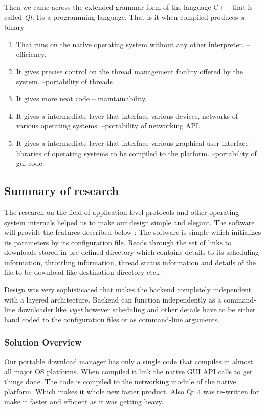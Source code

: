 \documentclass[pdftex,12pt,a4paper,pdfencoding=unicode]{article}
\begin{document}
\begin{onehalfspace}
      Then we came across the extended grammar form of the language C++ that is called \emph{Qt}. Its a programming language.
      That is it when compiled produces a binary
      \begin{enumerate}
        \item That runs on the native operating system without any other interpreter. --efficiency.
        \item It gives precise control on the thread management facility offered by the system. --portability of threads
        \item It gives more neat code -- maintainability.
        \item It gives a intermediate layer that interface various devices, networks of various operating systems.
          --portability of networking API.
        \item It gives a intermediate layer that interface various graphical user interface libraries of operating systems
          to be compiled to the platform. --portability of gui code.
      \end{enumerate}

      \subsection{Summary of research}
      The research on the field of application level protocols and other operating system internals helped us to make our design simple and
      elegant. The software will provide the features described below :
      The software is simple which initializes its parameters by its configuration file. Reads through the set of links to downloads stored
      in pre-defined directory which contains details to its scheduling information, throttling information, thread status information and
      details of the file to be download like destination directory etc\ldots

      Design was very sophisticated that makes the backend completely independent with a layered architecture. Backend can function
      independently as a command-line downloader like \emph{wget} however scheduling and other details have to be either hand coded to
      the configuration files or as command-line arguments.

      \subsubsection{Solution Overview}
      Our portable download manager has only a single code that compiles in almost all major OS platforms. When compiled it link the
      native GUI API calls to get things done. The code is compiled to the networking module of the native platform. Which makes it
      whole new faster product. Also Qt 4 was re-written for make it faster and efficient as it was getting heavy.


\end{onehalfspace}
\end{document}
